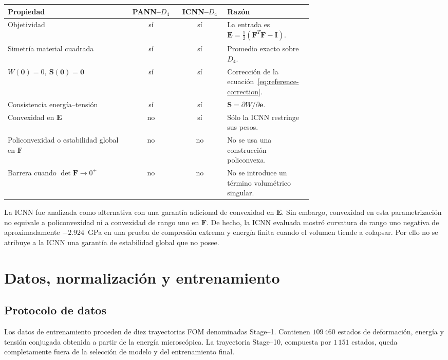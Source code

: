 \documentclass[11pt,a4paper]{article}
\newcommand{\E}{\ensuremath{\bm E}}
\newcommand{\F}{\ensuremath{\bm F}}
\newcommand{\Svec}{\ensuremath{\bm S}}
\newcommand{\evec}{\ensuremath{\bm e}}
\newcommand{\Dfour}{\ensuremath{D_4}}
\newcommand{\W}{\ensuremath{W}}
\newcommand{\FOM}{\textsc{FOM}}
\newcommand{\PANN}{\textsc{PANN--}\Dfour}
\newcommand{\ICNN}{\textsc{ICNN--}\Dfour}
\begin{document}
\begin{center}
\small
\begin{tabular}{p{0.40\linewidth}ccp{0.29\linewidth}}
\toprule
Propiedad & \PANN{} & \ICNN{} & Razón\\
\midrule
Objetividad & sí & sí & La entrada es \(\E=\frac12(\F^T\F-\bm I)\).\\
Simetría material cuadrada & sí & sí & Promedio exacto sobre \(\Dfour\).\\
\(\W(\bm0)=0,\ \Svec(\bm0)=\bm0\) & sí & sí & Corrección de la ecuación~\eqref{eq:reference-correction}.\\
Consistencia energía--tensión & sí & sí & \(\Svec=\partial\W/\partial\evec\).\\
Convexidad en \(\E\) & no & sí & Sólo la ICNN restringe sus pesos.\\
Policonvexidad o estabilidad global en \(\F\) & no & no & No se usa una construcción policonvexa.\\
Barrera cuando \(\det\F\rightarrow0^+\) & no & no & No se introduce un término volumétrico singular.\\
\bottomrule
\end{tabular}
\end{center}

La ICNN fue analizada como alternativa con una garantía adicional de
convexidad en \(\E\). Sin embargo, convexidad en esta parametrización no
equivale a policonvexidad ni a convexidad de rango uno en \(\F\). De hecho, la
ICNN evaluada mostró curvatura de rango uno negativa de aproximadamente
\(-2.924\)~GPa en una prueba de compresión extrema y energía finita cuando el
volumen tiende a colapsar. Por ello no se atribuye a la ICNN una garantía de
estabilidad global que no posee.

\section{Datos, normalización y entrenamiento}

\subsection{Protocolo de datos}

Los datos de entrenamiento proceden de diez trayectorias \FOM{} denominadas
Stage--1. Contienen \(109\,460\) estados de deformación, energía y tensión
conjugada obtenida a partir de la energía microscópica. La trayectoria
Stage--10, compuesta por \(1\,151\) estados, queda completamente fuera de la
selección de modelo y del entrenamiento final.
\end{document}
